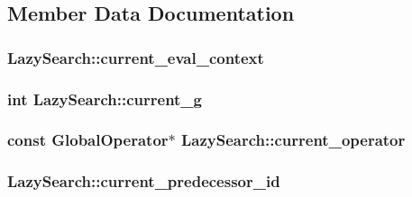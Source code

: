 \subsection{Member Data Documentation}
\hypertarget{classLazySearch_a9d67f87af37f3deb2ca38ebc9eabb019}{
\subsubsection[{current\-\_\-eval\-\_\-context}]{ Lazy\-Search\-::current\-\_\-eval\-\_\-context\hspace{0.3cm}{\ttfamily [protected]}}}\label{classLazySearch_a9d67f87af37f3deb2ca38ebc9eabb019}
\hypertarget{classLazySearch_aa9a52970b26305529f0cc5e896f9111e}{
\subsubsection[{current\-\_\-g}]{\setlength{\rightskip}{0pt plus 5cm}int Lazy\-Search\-::current\-\_\-g\hspace{0.3cm}{\ttfamily [protected]}}}\label{classLazySearch_aa9a52970b26305529f0cc5e896f9111e}
\hypertarget{classLazySearch_a928bb4390d1b061e2c1c6dd6588ed14d}{
\subsubsection[{current\-\_\-operator}]{\setlength{\rightskip}{0pt plus 5cm}const {\bf Global\-Operator}$\ast$ Lazy\-Search\-::current\-\_\-operator\hspace{0.3cm}{\ttfamily [protected]}}}\label{classLazySearch_a928bb4390d1b061e2c1c6dd6588ed14d}
\hypertarget{classLazySearch_a39019af3180b660aa0c256fc0e51285b}{
\subsubsection[{current\-\_\-predecessor\-\_\-id}]{ Lazy\-Search\-::current\-\_\-predecessor\-\_\-id\hspace{0.3cm}{\ttfamily [protected]}}}\label{classLazySearch_a39019af3180b660aa0c256fc0e51285b}
